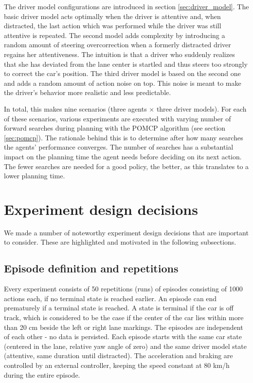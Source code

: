 The driver model configurations are introduced in section \ref{sec:driver_model}. The basic driver model acts optimally when the driver is attentive and, when distracted, the last action which was performed while the driver was still attentive is repeated. The second model adds complexity by introducing a random amount of steering overcorrection when a formerly distracted driver regains her attentiveness. The intuition is that a driver who suddenly realizes that she has deviated from the lane center is startled and thus steers too strongly to correct the car's position. The third driver model is based on the second one and adds a random amount of action noise on top. This noise is meant to make the driver's behavior more realistic and less predictable.

In total, this makes nine scenarios (three agents $\times$ three driver models). For each of these scenarios, various experiments are executed with varying number of forward searches during planning with the POMCP algorithm (see section \ref{sec:pomcp}). The rationale behind this is to determine after how many searches the agents' performance converges. The number of searches has a substantial impact on the planning time the agent needs before deciding on its next action. The fewer searches are needed for a good policy, the better, as this translates to a lower planning time.

\section{Experiment design decisions}
\label{sec:design_decisions}
We made a number of noteworthy experiment design decisions that are important to consider. These are highlighted and motivated in the following subsections.

\subsection{Episode definition and repetitions}



Every experiment consists of 50 repetitions (runs) of episodes consisting of 1000 actions each, if no terminal state is reached earlier. An episode can end prematurely if a terminal state is reached. A state is terminal if the car is off track, which is considered to be the case if the center of the car lies within more than 20 cm beside the left or right lane markings. The episodes are independent of each other - no data is persisted. Each episode starts with the same car state (centered in the lane, relative yaw angle of zero) and the same driver model state (attentive, same duration until distracted). The acceleration and braking are controlled by an external controller, keeping the speed constant at 80 km/h during the entire episode.

